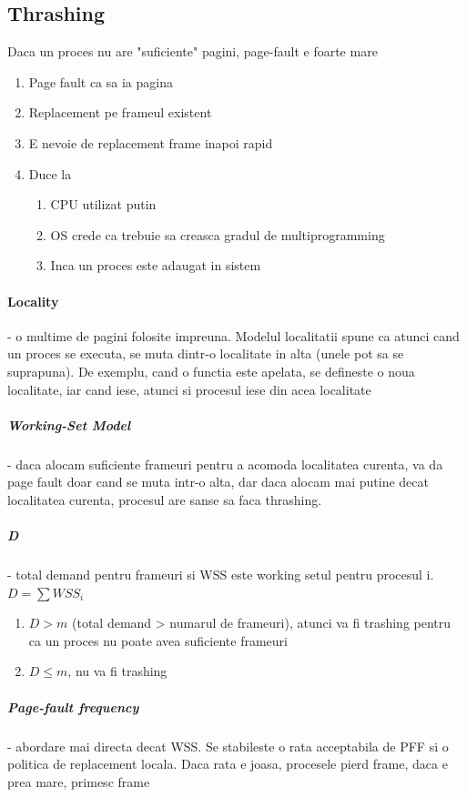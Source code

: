 \documentclass{article}
\begin{document}
\subsection*{Thrashing}
Daca un proces nu are "suficiente" pagini, page-fault e foarte mare
\begin{enumerate}
    \item Page fault ca sa ia pagina
    \item Replacement pe frameul existent
    \item E nevoie de replacement frame inapoi rapid
    \item Duce la
    \begin{enumerate}
        \item CPU utilizat putin
        \item OS crede ca trebuie sa creasca gradul de multiprogramming
        \item Inca un proces este adaugat in sistem
    \end{enumerate}
\end{enumerate}

\paragraph*{Locality} - o multime de pagini folosite impreuna. Modelul localitatii spune ca atunci cand un proces se executa, se muta dintr-o localitate in alta (unele pot sa se suprapuna). De exemplu, cand o functia este apelata, se defineste o noua localitate, iar cand iese, atunci si procesul iese din acea localitate

\subparagraph*{Working-Set Model} - daca alocam suficiente frameuri pentru a acomoda localitatea curenta, va da page fault doar cand se muta intr-o alta, dar daca alocam mai putine decat localitatea curenta, procesul are sanse sa faca thrashing.
\subparagraph*{D} - total demand pentru frameuri si WSS este working setul pentru procesul i. $D=\sum WSS_i$
\begin{enumerate}
    \item $D>m$ (total demand > numarul de frameuri), atunci va fi trashing pentru ca un proces nu poate avea suficiente frameuri
    \item $D\leq m$, nu va fi trashing
\end{enumerate}

\subparagraph*{Page-fault frequency} - abordare mai directa decat WSS. Se stabileste o rata acceptabila de PFF si o politica de replacement locala. Daca rata e joasa, procesele pierd frame, daca e prea mare, primesc frame
\end{document}
